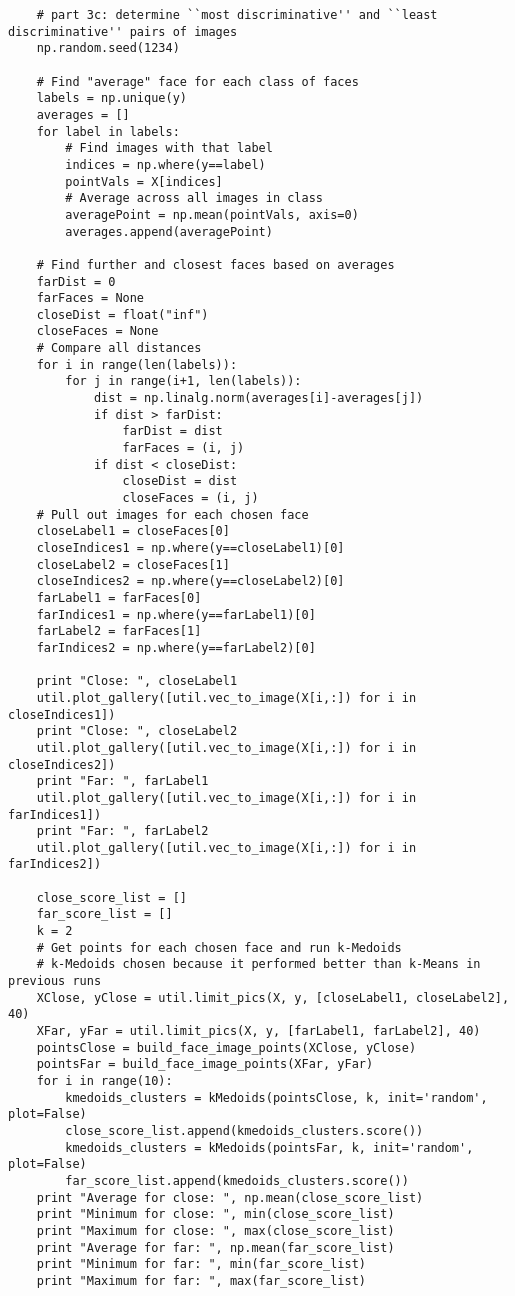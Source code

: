 \documentclass[11pt]{article}
\begin{document}
\begin{verbatim}
    # part 3c: determine ``most discriminative'' and ``least discriminative'' pairs of images
    np.random.seed(1234)

    # Find "average" face for each class of faces
    labels = np.unique(y)
    averages = []
    for label in labels:
        # Find images with that label
        indices = np.where(y==label)
        pointVals = X[indices]
        # Average across all images in class
        averagePoint = np.mean(pointVals, axis=0)
        averages.append(averagePoint)

    # Find further and closest faces based on averages
    farDist = 0
    farFaces = None
    closeDist = float("inf")
    closeFaces = None
    # Compare all distances
    for i in range(len(labels)):
        for j in range(i+1, len(labels)):
            dist = np.linalg.norm(averages[i]-averages[j])
            if dist > farDist:
                farDist = dist
                farFaces = (i, j)
            if dist < closeDist:
                closeDist = dist
                closeFaces = (i, j)
    # Pull out images for each chosen face
    closeLabel1 = closeFaces[0]
    closeIndices1 = np.where(y==closeLabel1)[0]
    closeLabel2 = closeFaces[1]
    closeIndices2 = np.where(y==closeLabel2)[0]
    farLabel1 = farFaces[0]
    farIndices1 = np.where(y==farLabel1)[0]
    farLabel2 = farFaces[1]
    farIndices2 = np.where(y==farLabel2)[0]

    print "Close: ", closeLabel1
    util.plot_gallery([util.vec_to_image(X[i,:]) for i in closeIndices1])
    print "Close: ", closeLabel2
    util.plot_gallery([util.vec_to_image(X[i,:]) for i in closeIndices2])
    print "Far: ", farLabel1
    util.plot_gallery([util.vec_to_image(X[i,:]) for i in farIndices1])
    print "Far: ", farLabel2
    util.plot_gallery([util.vec_to_image(X[i,:]) for i in farIndices2])

    close_score_list = []
    far_score_list = []
    k = 2
    # Get points for each chosen face and run k-Medoids
    # k-Medoids chosen because it performed better than k-Means in previous runs
    XClose, yClose = util.limit_pics(X, y, [closeLabel1, closeLabel2], 40)
    XFar, yFar = util.limit_pics(X, y, [farLabel1, farLabel2], 40)
    pointsClose = build_face_image_points(XClose, yClose)
    pointsFar = build_face_image_points(XFar, yFar)
    for i in range(10):
        kmedoids_clusters = kMedoids(pointsClose, k, init='random', plot=False) 
        close_score_list.append(kmedoids_clusters.score())
        kmedoids_clusters = kMedoids(pointsFar, k, init='random', plot=False) 
        far_score_list.append(kmedoids_clusters.score())
    print "Average for close: ", np.mean(close_score_list)
    print "Minimum for close: ", min(close_score_list)
    print "Maximum for close: ", max(close_score_list)
    print "Average for far: ", np.mean(far_score_list)
    print "Minimum for far: ", min(far_score_list)
    print "Maximum for far: ", max(far_score_list)


\end{verbatim}
\end{document}

